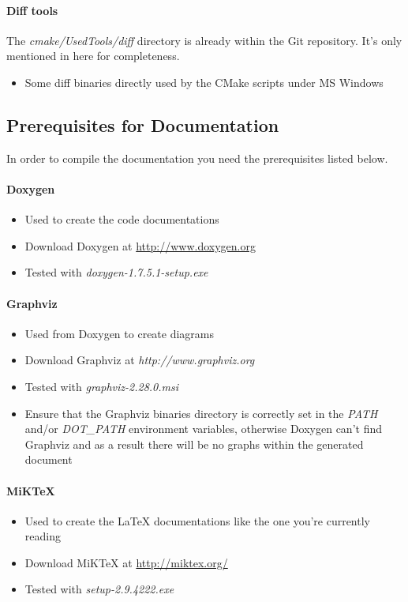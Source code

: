 \paragraph{Diff tools}
The \emph{cmake/UsedTools/diff} directory is already within the Git repository. It's only mentioned in here for completeness.
\begin{itemize}
\item{Some diff binaries directly used by the CMake scripts under \ac{MS} Windows}
\end{itemize}



\subsection{Prerequisites for Documentation}
In order to compile the documentation you need the prerequisites listed below.

\paragraph{Doxygen}
\begin{itemize}
\item{Used to create the code documentations}
\item{Download Doxygen at \url{http://www.doxygen.org}}
\item{Tested with \emph{doxygen-1.7.5.1-setup.exe}}
\end{itemize}


\paragraph{Graphviz}
\begin{itemize}
\item{Used from Doxygen to create diagrams}
\item{Download Graphviz at \emph{http://www.graphviz.org}}
\item{Tested with \emph{graphviz-2.28.0.msi}}
\item{Ensure that the Graphviz binaries directory is correctly set in the \emph{PATH} and/or \emph{DOT\_PATH} environment variables, otherwise Doxygen can't find Graphviz and as a result there will be no graphs within the generated document}
\end{itemize}


\paragraph{MiKTeX}
\begin{itemize}
\item{Used to create the \LaTeX{} documentations like the one you're currently reading}
\item{Download MiKTeX at \url{http://miktex.org/}}
\item{Tested with \emph{setup-2.9.4222.exe}}
\end{itemize}


